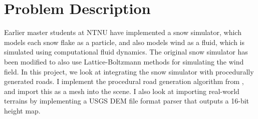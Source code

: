 \chapter*{Problem Description}
Earlier master students at NTNU have implemented a snow simulator, which models each snow flake as a particle, and also models wind as a fluid, which is simulated using computational fluid dynamics. The original snow simulator has been modified to also use Lattice-Boltzmann methods for simulating the wind field. In this project, we look at integrating the snow simulator with procedurally generated roads. I implement the procedural road generation algorithm from \cite{roadgen}, and import this as a mesh into the scene. I also look at importing real-world terrains by implementing a USGS DEM file format parser that outputs a 16-bit height map.
